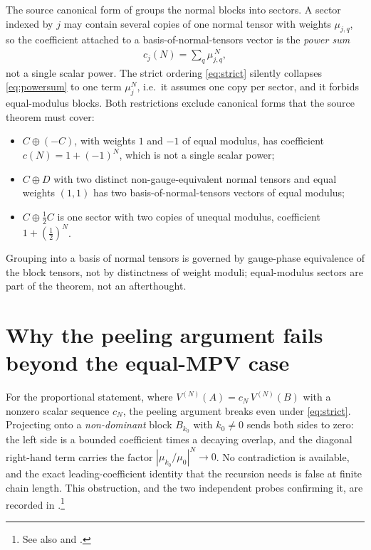 \documentclass{article}
\begin{document}
The source canonical form of \cite[Def.~4.2, lines~1864--1884]{Cirac2021Matrix}
groups the normal blocks into sectors. A sector indexed by $j$ may contain
several copies of one normal tensor with weights $\mu_{j,q}$, so the coefficient
attached to a basis-of-normal-tensors vector is the \emph{power sum}
\begin{align}
    c_j(N) =  \sum_q \mu_{j,q}^{\,N},
    \label{eq:powersum}
\end{align}
not a single scalar power. The strict ordering \eqref{eq:strict} silently
collapses \eqref{eq:powersum} to one term $\mu_j^N$, i.e.\ it assumes one copy
per sector, and it forbids equal-modulus blocks. Both restrictions exclude
canonical forms that the source theorem must cover:
\begin{itemize}
    \item $C \oplus (-C)$, with weights $1$ and $-1$ of equal modulus, has
          coefficient $c(N) = 1 + (-1)^N$, which is not a single scalar power;
    \item $C \oplus D$ with two distinct non-gauge-equivalent normal tensors and
          equal weights $(1,1)$ has two basis-of-normal-tensors vectors of equal
          modulus;
    \item $C \oplus \tfrac12 C$ is one sector with two copies of unequal modulus,
          coefficient $1 + (\tfrac12)^N$.
\end{itemize}
Grouping into a basis of normal tensors is governed by gauge-phase equivalence of
the block tensors, not by distinctness of weight moduli; equal-modulus sectors
are part of the theorem, not an afterthought.

\section{Why the peeling argument fails beyond the equal-MPV case}

For the proportional statement, where $V^{(N)}(A)=c_N\,V^{(N)}(B)$ with a nonzero
scalar sequence $c_N$, the peeling argument breaks even under \eqref{eq:strict}.
Projecting onto a \emph{non-dominant} block $B_{k_0}$ with $k_0\neq 0$ sends both
sides to zero: the left side is a bounded coefficient times a decaying overlap,
and the diagonal right-hand term carries the factor $|\mu_{k_0}/\mu_0|^N \to 0$.
No contradiction is available, and the exact leading-coefficient identity that the
recursion needs is false at finite chain length. This obstruction, and the two
independent probes confirming it, are recorded in
.\footnote{%
  See also  and
  .}
\end{document}
